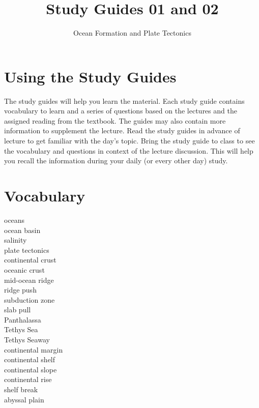 \documentclass[letterpaper]{tufte-handout}
\title{Study Guides 01 and 02\hfill}
\author{Ocean Formation and Plate Tectonics}
\date{} %
\begin{document}
\maketitle	%


\section{Using the Study Guides}
The study guides will help you learn the material.  Each study guide contains vocabulary to learn and a series of questions based on the lectures and the assigned reading from the textbook.  The guides may also contain more information to supplement the lecture.  Read the study guides in advance of lecture to get familiar with the day's topic. Bring the study guide to class to see the vocabulary and questions in context of the lecture discussion.  This will help you recall the information during your daily (or every other day) study.

\section{Vocabulary}
\vspace{-1\baselineskip}
\begin{multicols}{2}
oceans\\
ocean basin\\
salinity \\
plate tectonics\\
continental crust\\
oceanic crust\\
mid-ocean ridge\\
ridge push\\
subduction zone\\
slab pull\\
Panthalassa\\
Tethys Sea\\
Tethys Seaway\\
continental margin\\
continental shelf\\
continental slope\\
continental rise\\
shelf break\\
abyssal plain\\
\end{multicols}
\end{document}

